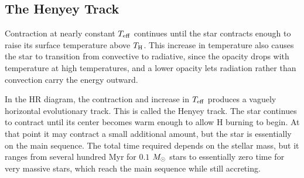 \subsection{The Henyey Track}

Contraction at nearly constant $T_{\rm eff}$ continues until the star contracts enough to raise its surface temperature above $T_{\rm H}$. This increase in temperature also causes the star to transition from convective to radiative, since the opacity drops with temperature at high temperatures, and a lower opacity lets radiation rather than convection carry the energy outward.

In the HR diagram, the contraction and increase in $T_{\rm eff}$ produces a vaguely horizontal evolutionary track. This is called the Henyey track. The star continues to contract until its center becomes warm enough to allow H burning to begin.
At that point it may contract a small additional amount, but the star is essentially on the main sequence. The total time required depends on the stellar mass, but it ranges from several hundred Myr for $0.1$ $M_{\odot}$ stars to essentially zero time for very massive stars, which reach the main sequence while still accreting.


